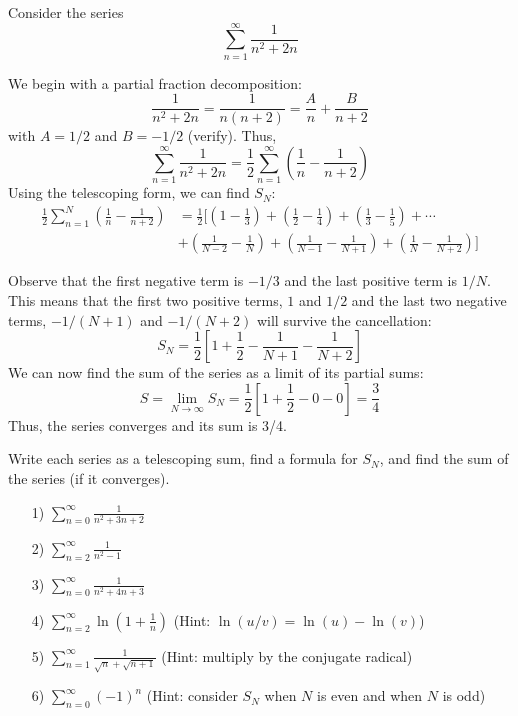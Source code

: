 \documentclass[handout]{ximera}
\begin{document}
\begin{example}[example 2]
Consider the series
\[
\sum_{n=1}^\infty \frac{1}{n^2 +2n}
\]

We begin with a partial fraction decomposition:
\[
\frac{1}{n^2 + 2n} = \frac{1}{n(n+2)} = \frac{A}{n} + \frac{B}{n+2}
\]
with $A = 1/2$ and $B=-1/2$ (verify). Thus,
\[
\sum_{n=1}^\infty \frac{1}{n^2 + 2n}  = \frac12 \sum_{n=1}^\infty \left( \frac{1}{n} - \frac{1}{n+2} \right)
\]
Using the telescoping form, we can find $S_N$:
\begin{align*}
 \frac12 \sum_{n=1}^N  \left(\frac{1}{n}-\frac{1}{n+2}\right) &= \frac12 \Bigg[\left(1 - \frac13 \right) + \left(\frac12 - \frac14 \right) 
 + \left(\frac13 - \frac15 \right) + \cdots \\
 & + \left(\frac{1}{N-2} - \frac{1}{N} \right) +\left(\frac{1}{N-1} - \frac{1}{N+1} \right) +\left(\frac{1}{N} - \frac{1}{N+2} \right) \Bigg]
\end{align*}

Observe that the first negative term is $-1/3$ and the last positive term is $1/N$. This means that the first two positive terms, 
$1$ and $1/2$ and the last two negative terms, $-1/(N+1)$ 
and $-1/(N+2)$  will survive the cancellation:
\[
S_N = \frac12 \left[ 1 + \frac12 - \frac{1}{N+1} - \frac{1}{N+2}\right]
\]
We can now find the sum of the series as a limit of its partial sums:
\[
S  = \lim_{N\to \infty} S_N = \frac12 \left[1 + \frac12 - 0- 0\right] =  \frac34
\]
Thus, the series converges and its sum is 3/4.
\end{example}



\begin{problem}
Write each series as a telescoping sum, find a formula for $S_N$, and find the sum of the series (if it converges).
\begin{itemize}
\item[1)] $\displaystyle{\sum_{n=0}^\infty \frac{1}{n^2 + 3n + 2}   }$
\item[2)] $\displaystyle{\sum_{n=2}^\infty \frac{1}{n^2 - 1}    }$
\item[3)] $\displaystyle{\sum_{n=0}^\infty \frac{1}{n^2 + 4n + 3}    }$
\item[4)] $\displaystyle{\sum_{n=2}^\infty  \ln\left(1 + \frac{1}{n}\right)  }$ (Hint: $\ln(u/v) = \ln(u) - \ln(v)$)
\item[5)] $\displaystyle{\sum_{n=1}^\infty  \frac{1}{\sqrt n + \sqrt{n+1}}  }$ (Hint: multiply by the conjugate radical)
\item[6)] $\displaystyle{\sum_{n=0}^\infty  (-1)^n  }$ (Hint: consider $S_N$ when $N$ is even and when $N$ is odd)
\end{itemize}
\end{problem}
\end{document}
